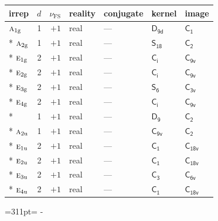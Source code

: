 \documentclass[10pt,a4paper]{article}
\newcommand{\needspace}[1]{\par\penalty-100\begingroup\dimen0=#1\relax\dimen2=\pagegoal
  \advance\dimen2-\pagetotal\ifdim\dimen0>\dimen2\relax\ifdim\dimen2>0pt\vfil\break\fi\fi
  \endgroup}
\numberwithin{equation}{section}
\newcommand{\grp}[1]{\mathsf{#1}}
\newcommand{\irr}[1]{\text{\normalfont\scshape #1}}
\newcommand{\detbox}[1]{{\setlength{\fboxsep}{1pt}\fbox{#1}}}
\newcommand{\ptag}[1]{\mathrm{#1}}
\newcommand{\fsind}{\nu_{\mathrm{FS}}}
\begin{document}
{\small\renewcommand{\arraystretch}{1.25}\begin{longtable}{@{}lrrllll@{}}\toprule
irrep & $d$ & $\fsind$ & reality & conjugate & kernel & image\\\midrule\endhead
\bottomrule\endfoot\endlastfoot
$\irr{a}_{1\ptag{g}}$ & 1 & $+1$ & real & --- & \href{D9d.pdf}{$\grp{D_{9d}}$} & \href{C1.pdf}{$\grp{C_{1}}$}\\*
$\irr{a}_{2\ptag{g}}$ & 1 & $+1$ & real & --- & \href{S18.pdf}{$\grp{S_{18}}$} & \href{C2.pdf}{$\grp{C_{2}}$}\\*
$\irr{e}_{1\ptag{g}}$ & 2 & $+1$ & real & --- & \href{S2.pdf}{$\grp{C_{i}}$} & \href{C9v.pdf}{$\grp{C_{9v}}$}\\*
$\irr{e}_{2\ptag{g}}$ & 2 & $+1$ & real & --- & \href{S2.pdf}{$\grp{C_{i}}$} & \href{C9v.pdf}{$\grp{C_{9v}}$}\\*
$\irr{e}_{3\ptag{g}}$ & 2 & $+1$ & real & --- & \href{S6.pdf}{$\grp{S_{6}}$} & \href{C3v.pdf}{$\grp{C_{3v}}$}\\*
$\irr{e}_{4\ptag{g}}$ & 2 & $+1$ & real & --- & \href{S2.pdf}{$\grp{C_{i}}$} & \href{C9v.pdf}{$\grp{C_{9v}}$}\\*
\detbox{$\irr{a}_{1\ptag{u}}$} & 1 & $+1$ & real & --- & \href{D9.pdf}{$\grp{D_{9}}$} & \href{C2.pdf}{$\grp{C_{2}}$}\\*
$\irr{a}_{2\ptag{u}}$ & 1 & $+1$ & real & --- & \href{C9v.pdf}{$\grp{C_{9v}}$} & \href{C2.pdf}{$\grp{C_{2}}$}\\*
$\irr{e}_{1\ptag{u}}$ & 2 & $+1$ & real & --- & \href{C1.pdf}{$\grp{C_{1}}$} & $\grp{C_{18v}}$\\*
$\irr{e}_{2\ptag{u}}$ & 2 & $+1$ & real & --- & \href{C1.pdf}{$\grp{C_{1}}$} & $\grp{C_{18v}}$\\*
$\irr{e}_{3\ptag{u}}$ & 2 & $+1$ & real & --- & \href{C3.pdf}{$\grp{C_{3}}$} & \href{C6v.pdf}{$\grp{C_{6v}}$}\\*
$\irr{e}_{4\ptag{u}}$ & 2 & $+1$ & real & --- & \href{C1.pdf}{$\grp{C_{1}}$} & $\grp{C_{18v}}$\\
\bottomrule\end{longtable}}
\needspace{311pt}
\end{document}
